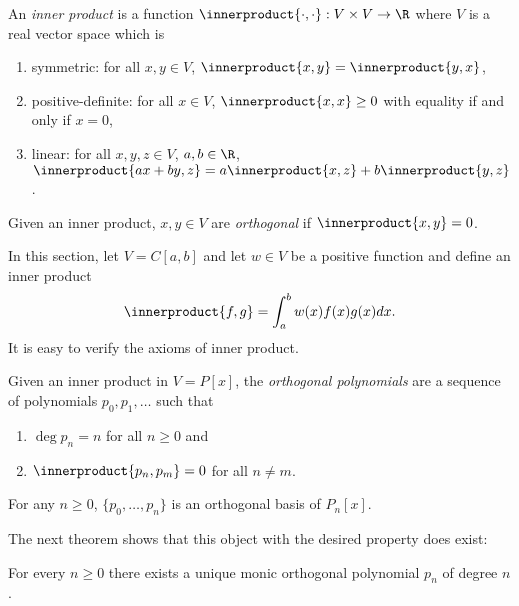 \documentclass[a4paper]{article}
\newcommand*{\inner}{\innerproduct}
\begin{document}
\begin{definition}
  An \emph{inner product} is a function \(\inner{\cdot, \cdot}: V \times V \to \R\) where \(V\) is a real vector space which is
  \begin{enumerate}
  \item symmetric: for all \(x, y \in V\), \(\inner{x, y} = \inner{y, x}\),
  \item positive-definite: for all \(x \in V\), \(\inner{x, x} \geq 0\) with equality if and only if \(x = 0\),
  \item linear: for all \(x, y, z \in V\), \(a, b \in \R\), \(\inner{ax + by, z} = a\inner{x, z} + b\inner{y, z}\).
  \end{enumerate}
\end{definition}

\begin{definition}[Orthogonality]
  Given an inner product, \(x, y \in V\) are \emph{orthogonal} if \(\inner{x, y} = 0\).
\end{definition}

In this section, let \(V = C[a, b]\) and let \(w \in V\) be a positive function and define an inner product
\[
  \inner{f, g} = \int_a^b w(x)f(x)g(x) dx.
\]
It is easy to verify the axioms of inner product.

\begin{definition}
  Given an inner product in \(V = P[x]\), the \emph{orthogonal polynomials} are a sequence of polynomials \(p_0, p_1, \dots\) such that
  \begin{enumerate}
  \item \(\deg p_n = n\) for all \(n \geq 0\) and
  \item \(\inner{p_n, p_m} = 0\) for all \(n \neq m\).
  \end{enumerate}
\end{definition}

\begin{remark}
  For any \(n \geq 0\), \(\{p_0, \dots, p_n\}\) is an orthogonal basis of \(P_n[x]\).
\end{remark}

The next theorem shows that this object with the desired property does exist:

\begin{theorem}
  For every \(n \geq 0\) there exists a unique monic orthogonal polynomial \(p_n\) of degree \(n\).
\end{theorem}
\end{document}
